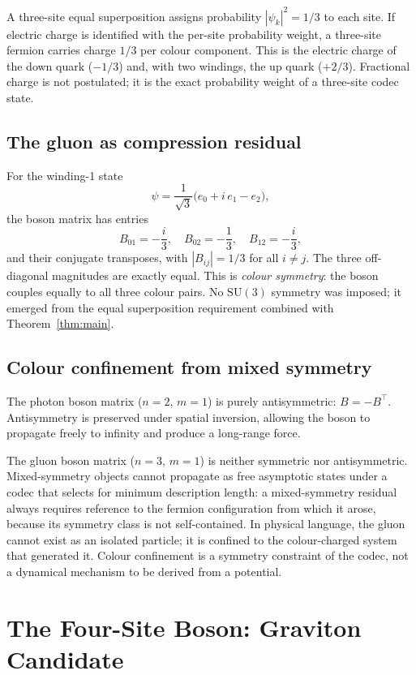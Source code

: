 \documentclass[11pt]{article}
\begin{document}
A three-site equal superposition assigns probability $|\psi_k|^2 = 1/3$
to each site.
If electric charge is identified with the per-site probability weight,
a three-site fermion carries charge $1/3$ per colour component.
This is the electric charge of the down quark ($-1/3$) and, with two
windings, the up quark ($+2/3$).
Fractional charge is not postulated; it is the exact probability weight
of a three-site codec state.

\subsection{The gluon as compression residual}

For the winding-1 state
\[
  \psi = \frac{1}{\sqrt{3}}\bigl(e_0 + i\,e_1 - e_2\bigr),
\]
the boson matrix has entries
\[
  B_{01} = -\frac{i}{3}, \quad
  B_{02} = -\frac{1}{3}, \quad
  B_{12} = -\frac{i}{3},
\]
and their conjugate transposes, with $|B_{ij}| = 1/3$ for all $i \neq j$.
The three off-diagonal magnitudes are exactly equal.
This is \emph{colour symmetry}: the boson couples equally to all three
colour pairs.
No $\mathrm{SU}(3)$ symmetry was imposed; it emerged from the equal
superposition requirement combined with Theorem~\ref{thm:main}.

\subsection{Colour confinement from mixed symmetry}

The photon boson matrix ($n=2$, $m=1$) is purely antisymmetric:
$B = -B^\top$.
Antisymmetry is preserved under spatial inversion, allowing the boson
to propagate freely to infinity and produce a long-range force.

The gluon boson matrix ($n=3$, $m=1$) is neither symmetric nor
antisymmetric.
Mixed-symmetry objects cannot propagate as free asymptotic states under
a codec that selects for minimum description length: a mixed-symmetry
residual always requires reference to the fermion configuration from
which it arose, because its symmetry class is not self-contained.
In physical language, the gluon cannot exist as an isolated particle;
it is confined to the colour-charged system that generated it.
Colour confinement is a symmetry constraint of the codec, not a
dynamical mechanism to be derived from a potential.

\section{The Four-Site Boson: Graviton Candidate}
\label{sec:graviton}
\end{document}
